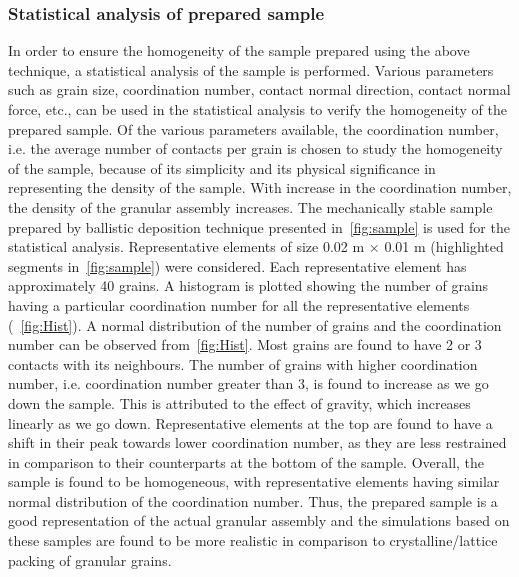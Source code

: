 \subsubsection{Statistical analysis of prepared sample}
In order to ensure the homogeneity of the sample prepared using the above 
technique, a statistical 
analysis of the sample is performed. Various parameters such as grain size, 
coordination 
number, 
contact normal direction, contact normal force, etc., can be used in the 
statistical analysis to 
verify the homogeneity of the prepared sample. Of the various parameters 
available, the 
coordination number, i.e. the average number of contacts per grain is chosen 
to study the 
homogeneity of the sample, because of its simplicity and its physical 
significance in representing 
the density of the sample. With increase in the coordination number, the 
density of the granular 
assembly increases. The mechanically stable sample prepared by ballistic 
deposition technique 
presented in~\cref{fig:sample} is used for the statistical analysis. 
Representative elements 
of size 0.02 m $\times$ 0.01 m (highlighted segments in~\cref{fig:sample}) were 
considered. 
Each representative element has approximately 40 grains. A histogram is 
plotted showing the 
number of grains having a particular coordination number for all the 
representative elements 
(~\cref{fig:Hist}). A normal distribution of the number of grains and the 
coordination 
number can be observed from~\cref{fig:Hist}. Most grains are found to have 2 
or 3 contacts 
with its neighbours. The number of grains with higher coordination number, 
i.e. coordination 
number greater than 3, is found to increase as we go down the sample. This is 
attributed to the 
effect of gravity, which increases linearly as we go down. Representative 
elements at the top are 
found to have a shift in their peak towards lower coordination number, as they 
are less restrained 
in comparison to their counterparts at the bottom of the sample. Overall, the 
sample is found to 
be 
homogeneous, with representative elements having similar normal distribution of 
the coordination 
number. Thus, the prepared sample is a good representation of the actual 
granular assembly and the 
simulations based on these samples are found to be more realistic in comparison 
to 
crystalline/lattice packing of granular grains. 

